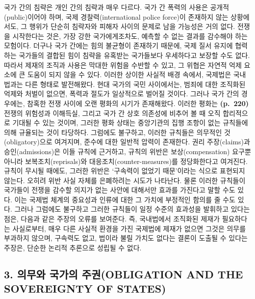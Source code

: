 국가 간의 침략은 개인 간의 침략과 매우 다르다. 국가 간 폭력의 사용은
공개적(public)이어야 하며, 국제 경찰력(international police force)이
존재하지 않는 상황에서도, 그 행위가 단순히 침략자와 피해자 사이의 문제로
남을 가능성은 거의 없다. 전쟁을 시작한다는 것은, 가장 강한
국가에게조차도, 예측할 수 없는 결과를 감수해야 하는 모험이다. 더구나
국가 간에는 힘의 불균형이 존재하기 때문에, 국제 질서 유지에 협력하는
국가들의 결합된 힘이 침략을 유혹받는 국가들보다 우세하다고 보장할 수도
없다. 따라서 제재의 조직과 사용은 막대한 위험을 수반할 수 있고, 그
위협은 자연적 억제 요소에 큰 도움이 되지 않을 수 있다. 이러한 상이한
사실적 배경 속에서, 국제법은 국내법과는 다른 형태로 발전해왔다. 현대
국가의 국민 사이에서는, 범죄에 대한 조직화된 억제와 처벌이 없으면,
폭력과 절도가 일상적으로 벌어질 것이다. 그러나 국가 간의 경우에는,
참혹한 전쟁 사이에 오랜 평화의 시기가 존재해왔다. 이러한 평화는
\textbf{(p.~220)} 전쟁의 위험성과 이해득실, 그리고 국가 간 상호 의존성에
비추어 볼 때 오직 합리적으로 기대될 수 있는 것이며, 그러한 평화 상태는
중앙기관의 집행 조항이 없는 규칙들에 의해 규율되는 것이 타당하다.
그럼에도 불구하고, 이러한 규칙들은 의무적인 것(obligatory)으로 여겨지며,
준수에 대한 일반적 압력이 존재한다. 권리 주장(claims)과
승인(admissions)은 이들 규칙에 근거하고, 규칙의 위반은
보상(compensation) 요구뿐 아니라 보복조치(reprisals)와
대응조치(counter-measures)를 정당화한다고 여겨진다. 규칙이 무시될
때에도, 그러한 위반은 `구속력이 없었기 때문'이라는 식으로 표현되지
않는다. 오히려 위반 사실 자체를 은폐하려는 시도가 나타난다. 물론 이러한
규칙들이 국가들이 전쟁을 감수할 의지가 없는 사안에 대해서만 효과를
가진다고 말할 수도 있다. 이는 국제법 체계의 중요성과 인류에 대한 그
가치에 부정적인 함의를 줄 수도 있다. 그러나 그럼에도 불구하고 그러한
규칙들이 일정 수준의 효과성을 발휘하고 있다는 점은, 다음과 같은 주장의
오류를 보여준다. 즉, 국내법에서 조직화된 제재가 필요하다는 사실로부터,
매우 다른 사실적 환경을 가진 국제법에 제재가 없으면 그것은 의무를
부과하지 않으며, 구속력도 없고, 법이라 불릴 가치도 없다는 결론이 도출될
수 있다는 주장은, 단순한 논리적 추론으로 성립될 수 없다.

\subsection{3. 의무와 국가의 주권(OBLIGATION AND THE SOVEREIGNTY OF
STATES)}\label{uxc758uxbb34uxc640-uxad6duxac00uxc758-uxc8fcuxad8cobligation-and-the-sovereignty-of-states}

